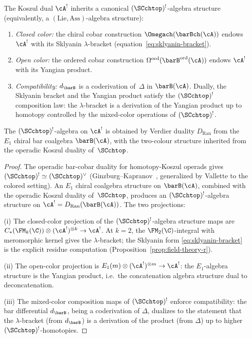 \begin{theorem}[Dual $(\SCchtop)^{!}$-algebra $= (\mathrm{Lie},\mathrm{Ass})$-algebra;
\ClaimStatusProvedHere]
The Koszul dual $\cA^!$ inherits a canonical
$(\SCchtop)^{!}$-algebra structure (equivalently, a $(\mathrm{Lie},\mathrm{Ass})$-algebra structure):
\begin{enumerate}[label=\textup{(\roman*)}]
\item \emph{Closed color:} the chiral cobar construction
 $\Omegach(\barBch(\cA))$ endows $\cA^!$ with its Sklyanin
 $\lambda$-bracket
 (equation~\eqref{eq:sklyanin-bracket}).
\item \emph{Open color:} the ordered cobar construction
 $\Omega^{\mathrm{ord}}(\barB^{\mathrm{ord}}(\cA))$ endows
 $\cA^!$ with its Yangian product.
\item \emph{Compatibility:} $d_{\barB}$ is a coderivation
 of~$\Delta$ in $\barB(\cA)$. Dually, the
 Sklyanin bracket and the Yangian product satisfy the
 $(\SCchtop)^{!}$ composition law: the $\lambda$-bracket is a
 derivation of the Yangian product up to homotopy controlled
 by the mixed-color operations of $(\SCchtop)^{!}$.
\end{enumerate}
The $(\SCchtop)^{!}$-algebra on $\cA^!$ is obtained by Verdier duality
$D_{\mathrm{Ran}}$ from the $E_1$ chiral bar coalgebra
$\barB(\cA)$, with the two-colour structure inherited from the
operadic Koszul duality of~$\SCchtop$.
\end{theorem}

\begin{proof}
The operadic bar-cobar duality for homotopy-Koszul operads
gives $(\SCchtop)^! \simeq (\SCchtop)^{\vee}$
(Ginzburg--Kapranov~\cite{GK94}, generalized by Vallette
\cite{Val07} to the colored setting). An
$E_1$ chiral coalgebra structure on $\barB(\cA)$, combined with the
operadic Koszul duality of~$\SCchtop$, produces an
$(\SCchtop)^{!}$-algebra structure on $\cA^! = D_{\mathrm{Ran}}(\barB(\cA))$.
The two projections:

(i) The closed-color projection of the $(\SCchtop)^{!}$-algebra
structure maps are
$C_\ast(\FM_k(\C)) \otimes (\cA^!)^{\otimes k} \to \cA^!$.
At $k = 2$, the $\FM_2(\C)$-integral with meromorphic kernel
gives the $\lambda$-bracket; the Sklyanin form
\eqref{eq:sklyanin-bracket} is the explicit residue computation
(Proposition~\ref{prop:field-theory-r}).

(ii) The open-color projection is
$E_1(m) \otimes (\cA^!)^{\otimes m} \to \cA^!$: the
$E_1$-algebra structure is the Yangian product, i.e.\ the
concatenation algebra structure dual to deconcatenation.

(iii) The mixed-color composition maps of $(\SCchtop)^{!}$ enforce
compatibility: the bar differential $d_{\barB}$, being a
coderivation of $\Delta$, dualizes to the statement that the
$\lambda$-bracket (from $d_{\barB}$) is a derivation of the
product (from $\Delta$) up to higher $(\SCchtop)^{!}$-homotopies.
\end{proof}


